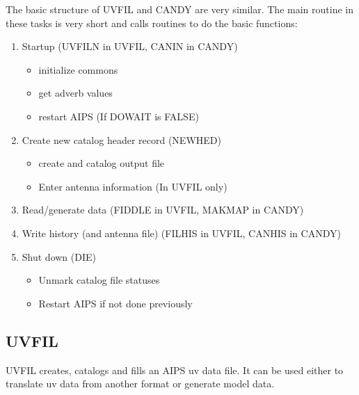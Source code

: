 The basic structure of UVFIL and CANDY are very similar.  The main
routine in these tasks is very short and calls routines to do the
basic functions:
\begin{enumerate} %
\item Startup (UVFILN in UVFIL, CANIN in CANDY)
\begin{itemize} %
\item initialize commons
\item get adverb values
\item restart AIPS (If DOWAIT is FALSE)
\end{itemize} %
\item Create new catalog header record (NEWHED)
\begin{itemize} %
\item create and catalog output file
\item Enter antenna information (In UVFIL only)
\end{itemize} %
\item Read/generate data (FIDDLE in UVFIL, MAKMAP in CANDY)
\item Write history (and  antenna file) (FILHIS in UVFIL, CANHIS in CANDY)
\item Shut down (DIE)
\begin{itemize} %
\item Unmark catalog file statuses
\item Restart AIPS if not done previously
\end{itemize} %
\end{enumerate} %

\subsection{UVFIL}
 UVFIL creates, catalogs and fills an AIPS uv data file. It can be
used either to translate uv data from another format or generate model
data.

